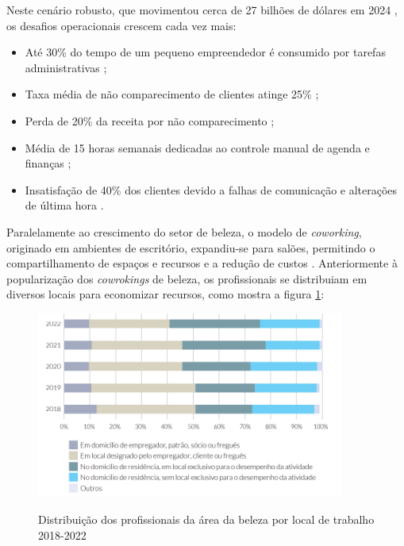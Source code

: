 \FloatBarrier

Neste cenário robusto, que movimentou cerca de 27 bilhões de dólares em 2024 \cite{ecommercenapratica2025}, os desafios operacionais crescem cada vez mais: 

\begin{itemize}
	\item Até 30\% do tempo de um pequeno empreendedor é consumido por tarefas administrativas \cite{senac2022};
	\item Taxa média de não comparecimento de clientes atinge 25\% \cite{booksy2022};
	\item Perda de 20\% da receita por não comparecimento \cite{abihpec2021};
	\item Média de 15 horas semanais dedicadas ao controle manual de agenda e finanças \cite{fgv2020};
	\item Insatisfação de 40\% dos clientes devido a falhas de comunicação e alterações de última hora \cite{mindminers2022}.
\end{itemize}

Paralelamente ao crescimento do setor de beleza, o modelo de \emph{coworking}, originado em ambientes de escritório, expandiu-se para salões, permitindo o compartilhamento de espaços e recursos e a redução de custos \cite{sebrae_coworking,sebraesc2025}. Anteriormente à popularização dos \emph{cowrokings} de beleza, os profissionais se distribuiam em diversos locais para economizar recursos, como mostra a figura \ref{fig:Distribuição_locais}:

\begin{figure}[htb]
	\centering
	\caption{Distribuição dos profissionais da área da beleza por local de trabalho 2018-2022}
	\includegraphics[width=0.9\textwidth]{cap01-Introducao/Images/1.3_local_trabalho_profissionais}
	\label{fig:Distribuição_locais}
\end{figure}

